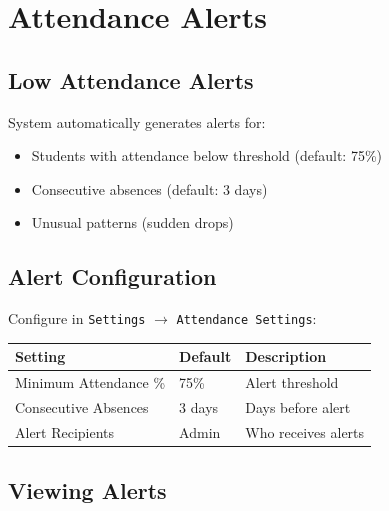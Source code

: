 \documentclass[12pt,a4paper]{report}
\begin{document}
\chapter{Attendance Alerts}

\section{Low Attendance Alerts}

System automatically generates alerts for:
\begin{itemize}[leftmargin=*]
    \item Students with attendance below threshold (default: 75\%)
    \item Consecutive absences (default: 3 days)
    \item Unusual patterns (sudden drops)
\end{itemize}

\section{Alert Configuration}

Configure in \texttt{Settings} $\rightarrow$ \texttt{Attendance Settings}:

\begin{longtable}{@{}p{5cm}p{3cm}p{5cm}@{}}
\toprule
\textbf{Setting} & \textbf{Default} & \textbf{Description} \\
\midrule
\endhead
Minimum Attendance \% & 75\% & Alert threshold \\
Consecutive Absences & 3 days & Days before alert \\
Alert Recipients & Admin & Who receives alerts \\
\bottomrule
\end{longtable}

\section{Viewing Alerts}

\begin{center}
\end{center}
\end{document}
